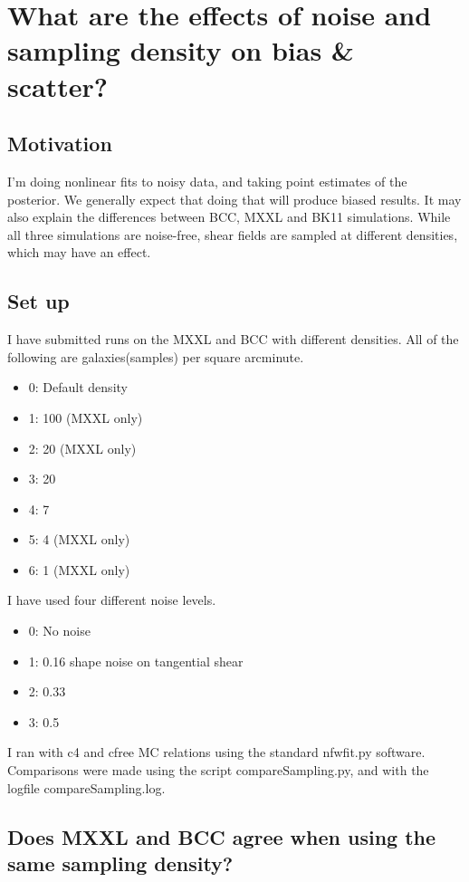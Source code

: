 \documentclass[11pt]{article}
\begin{document}
\section{What are the effects of noise and sampling density on bias \& scatter?}
\label{sec:noisebias}

\subsection{Motivation}
I'm doing nonlinear fits to noisy data, and taking point estimates of the posterior. We generally expect that doing that will produce biased results. It may also explain the differences between BCC, MXXL and BK11 simulations. While all three simulations are noise-free, shear fields are sampled at different densities, which may have an effect.

\subsection{Set up}

I have submitted runs on the MXXL and BCC with different densities. All of the following are galaxies(samples) per square arcminute.
\begin{itemize}
\item 0: Default density
\item 1: 100 (MXXL only)
\item 2: 20 (MXXL only)
\item 3: 20
\item 4: 7
\item 5: 4  (MXXL only)
\item 6: 1  (MXXL only)
\end{itemize}

I have used four different noise levels.
\begin{itemize}
\item 0: No noise
\item 1: 0.16 shape noise on tangential shear
\item 2: 0.33
\item 3: 0.5
\end{itemize}

I ran with c4 and cfree MC relations using the standard nfwfit.py software. Comparisons were made using the script compareSampling.py, and with the logfile compareSampling.log.



\subsection{Does MXXL and BCC agree when using the same sampling density?}
\end{document}
